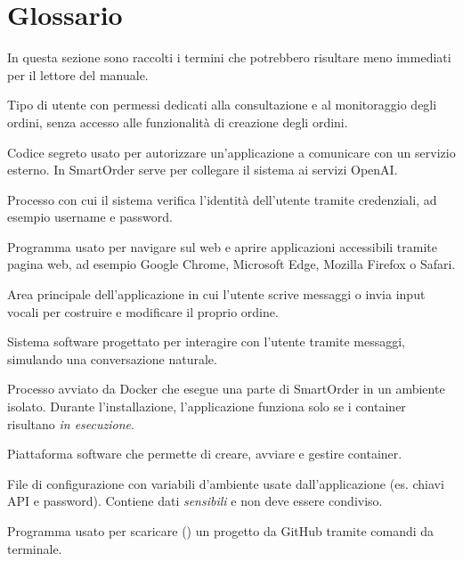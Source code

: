 \section{Glossario}

In questa sezione sono raccolti i termini che potrebbero risultare meno immediati per il lettore del manuale.

Tipo di utente con permessi dedicati alla consultazione e al monitoraggio degli ordini, senza accesso alle funzionalit\`a di creazione degli ordini.

Codice segreto usato per autorizzare un'applicazione a comunicare con un servizio esterno. In SmartOrder serve per collegare il sistema ai servizi OpenAI.

Processo con cui il sistema verifica l'identit\`a dell'utente tramite credenziali, ad esempio username e password.

Programma usato per navigare sul web e aprire applicazioni accessibili tramite pagina web, ad esempio Google Chrome, Microsoft Edge, Mozilla Firefox o Safari.

Area principale dell'applicazione in cui l'utente scrive messaggi o invia input vocali per costruire e modificare il proprio ordine.

Sistema software progettato per interagire con l'utente tramite messaggi, simulando una conversazione naturale.

Processo avviato da Docker che esegue una parte di SmartOrder in un ambiente isolato. 
Durante l’installazione, l’applicazione funziona solo se i container risultano \textit{in esecuzione}.

Piattaforma software che permette di creare, avviare e gestire container.

File di configurazione con variabili d’ambiente usate dall’applicazione (es. chiavi API e password).
Contiene dati \textit{sensibili} e non deve essere condiviso.

Programma usato per scaricare () un progetto da GitHub tramite comandi da terminale.


